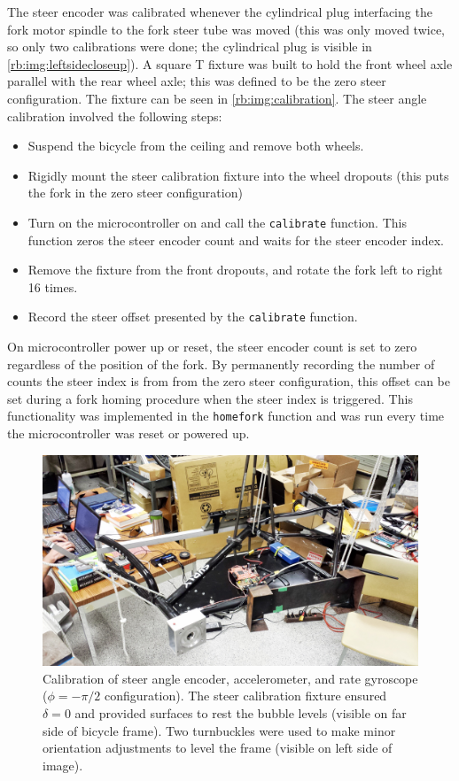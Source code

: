 The steer encoder was calibrated whenever the cylindrical plug interfacing the
fork motor spindle to the fork steer tube was moved (this was only moved twice,
so only two calibrations were done; the cylindrical plug is visible in
\autoref{rb:img:leftsidecloseup}). A square T fixture was built to hold the
front wheel axle parallel with the rear wheel axle; this was defined to be the
zero steer configuration. The fixture can be seen in
\autoref{rb:img:calibration}. The steer angle calibration involved the
following steps:
\begin{itemize}
  \item Suspend the bicycle from the ceiling and remove both wheels.
  \item Rigidly mount the steer calibration fixture into the wheel dropouts
    (this puts the fork in the zero steer configuration)
  \item Turn on the microcontroller on and call the \verb|calibrate| function.
    This function zeros the steer encoder count and waits for the steer encoder
    index.
  \item Remove the fixture from the front dropouts, and rotate the fork left to
    right 16 times.
  \item Record the steer offset presented by the \verb|calibrate| function.
\end{itemize}
On microcontroller power up or reset, the steer encoder count is set to zero
regardless of the position of the fork. By permanently recording the number of
counts the steer index is from from the zero steer configuration, this offset
can be set during a fork homing procedure when the steer index is triggered.
This functionality was implemented in the \verb|homefork| function and was run
every time the microcontroller was reset or powered up.

\begin{figure}[ht]
  \centering
  \includegraphics[width=\textwidth]{images/20130711_163732_2.jpg}
  \caption{Calibration of steer angle encoder, accelerometer, and rate
    gyroscope ($\phi=-\pi/2$ configuration). The steer calibration fixture
    ensured $\delta=0$ and provided surfaces to rest the bubble levels (visible
    on far side of bicycle frame). Two turnbuckles were used to make minor
  orientation adjustments to level the frame (visible on left side of image).}
  \label{rb:img:calibration}
\end{figure}


